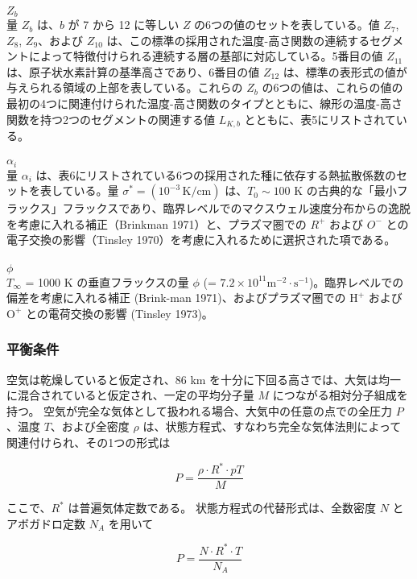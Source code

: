 \documentclass{article}
\begin{document}
\\$Z_b$\\
量 $Z_b$ は、$b$ が 7 から 12 に等しい $Z$ の6つの値のセットを表している。値 $Z_7$, $Z_8$, $Z_9$、および $Z_{10}$ は、この標準の採用された温度-高さ関数の連続するセグメントによって特徴付けられる連続する層の基部に対応している。5番目の値 $Z_{11}$ は、原子状水素計算の基準高さであり、6番目の値 $Z_{12}$ は、標準の表形式の値が与えられる領域の上部を表している。これらの $Z_b$ の6つの値は、これらの値の最初の4つに関連付けられた温度-高さ関数のタイプとともに、線形の温度-高さ関数を持つ2つのセグメントの関連する値 $L_{K,b}$ とともに、表5にリストされている。\\
\\$\alpha_i$\\
量 $\alpha_i$ は、表6にリストされている6つの採用された種に依存する熱拡散係数のセットを表している。量 $\sigma^* = (10^{-3}\, \mathrm{K/cm})$ は、$T_{0} \sim 100$ K の古典的な「最小フラックス」フラックスであり、臨界レベルでのマクスウェル速度分布からの逸脱を考慮に入れる補正（Brinkman 1971）と、プラズマ圏での $R^+$ および $O^-$ との電子交換の影響（Tinsley 1970）を考慮に入れるために選択された項である。\\
\\$\phi$\\
$T _\infty$ = 1000 K の垂直フラックスの量 $\phi$ (= $7.2\times 10^{11}\text{m}^{-2} \cdot \text{s}^{-1}$)。臨界レベルでの偏差を考慮に入れる補正 (Brink-man 1971)、およびプラズマ圏での $\text{H}^+$ および $\text{O}^+$ との電荷交換の影響 (Tinsley 1973)。

\subsubsection{平衡条件}
空気は乾燥していると仮定され、86 km を十分に下回る高さでは、大気は均一に混合されていると仮定され、一定の平均分子量 $M$ につながる相対分子組成を持つ。
空気が完全な気体として扱われる場合、大気中の任意の点での全圧力 $P$、温度 $T$、および全密度 $\rho$ は、状態方程式、すなわち完全な気体法則によって関連付けられ、その1つの形式は

\begin{equation}
  P = \frac{\rho \cdot R^* \cdot pT}{M} \tag{1}
\end{equation}

ここで、$R^*$ は普遍気体定数である。
状態方程式の代替形式は、全数密度 $N$ とアボガドロ定数 $N_A$ を用いて

\begin{equation}
  P = \frac{N \cdot R^* \cdot T}{N_A} \tag{2}
\end{equation}
\end{document}
